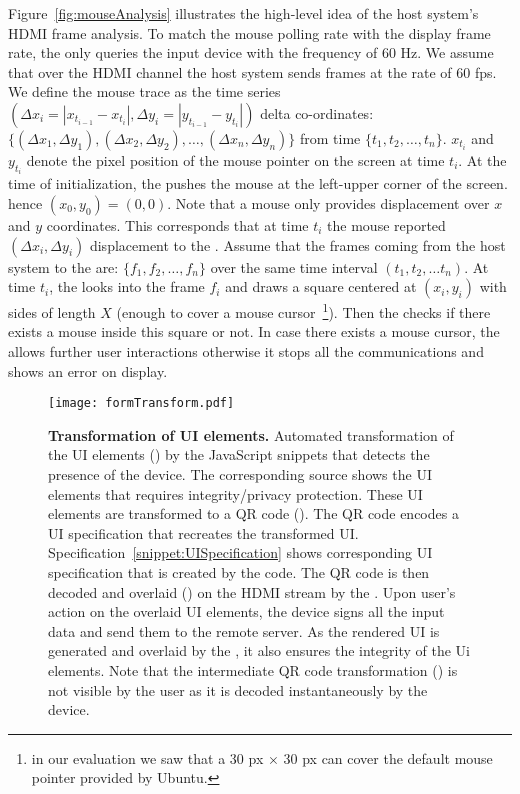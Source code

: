 Figure~\ref{fig:mouseAnalysis} illustrates the high-level idea of the host system's HDMI frame analysis. To match the mouse polling rate with the display frame rate, the \device only queries the input device with the frequency of $60$ Hz. We assume that over the HDMI channel the host system sends frames at the rate of $60$ fps. We define the mouse trace as the time series $(\Delta x_i = |x_{t_{i-1}} - x_{t_{i}}|, \Delta y_i=|y_{t_{i-1}} - y_{t_{i}}|)$ delta co-ordinates: $\{(\Delta x_1, \Delta y_1), (\Delta x_2, \Delta y_2), \ldots, (\Delta x_n, \Delta y_n)\}$ from time $\{t_1, t_2, \ldots, t_n\}$. $x_{t_{i}}$ and $y_{t_{i}}$ denote the pixel position of the mouse pointer on the screen at time $t_i$. At the time of initialization, the \device pushes the mouse at the left-upper corner of the screen. hence $(x_0, y_0) = (0, 0)$.  
Note that a mouse only provides displacement over $x$ and $y$ coordinates. This corresponds that at time $t_i$ the mouse reported $(\Delta x_i, \Delta y_i)$ displacement to the \device. Assume that the frames coming from the host system to the \device are: $\{f_1, f_2, \ldots, f_n\}$ over the same time interval $(t_1, t_2,\ldots t_n)$. At time $t_i$, the \device looks into the frame $f_i$ and draws a square centered at $(x_i, y_i)$ with sides of length $X$ (enough to cover a mouse cursor~\footnote{in our evaluation we saw that a 30 px $\times$ 30 px can cover the default mouse pointer provided by Ubuntu.}). Then the \device checks if there exists a mouse inside this square or not. In case there exists a mouse cursor, the \device allows further user interactions otherwise it stops all the communications and shows an error on display.


\begin{figure*}[t]
\centering
\texttt{[image: formTransform.pdf]}
\caption{\textbf{Transformation of UI elements.} Automated transformation of the UI elements (\one) by the \name JavaScript snippets that detects the presence of the device. The corresponding \html source shows the UI elements that requires integrity/privacy protection. These UI elements are transformed to a QR code (\two). The QR code encodes a UI specification that recreates the transformed UI. Specification~\ref{snippet:UISpecification} shows corresponding UI specification that is created by the \name \js code. The QR code is then decoded and overlaid (\three) on the HDMI stream by the \device. Upon user's action on the overlaid UI elements, the device signs all the input data and send them to the remote server. As the rendered UI is generated and overlaid by the \device, it also ensures the integrity of the Ui elements. Note that the intermediate QR code transformation (\two) is not visible by the user as it is decoded instantaneously by the device.}
\label{fig:transformation}
\end{figure*}


